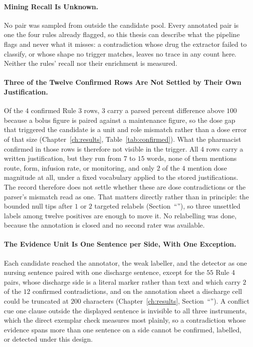 \paragraph{Mining Recall Is Unknown.} No pair was sampled from outside the candidate pool. Every
annotated pair is one the four rules already flagged, so this thesis can describe what the pipeline
flags and never what it misses: a contradiction whose drug the extractor failed to classify, or
whose shape no trigger matches, leaves no trace in any count here. Neither the rules' recall nor
their enrichment is measured.

\paragraph{Three of the Twelve Confirmed Rows Are Not Settled by Their Own Justification.}
Of the $4$ confirmed Rule 3 rows, $3$ carry a parsed percent difference above $100$ because a bolus
figure is paired against a maintenance figure, so the dose gap that triggered the candidate is a
unit and role mismatch rather than a dose error of that size (Chapter~\ref{ch:results},
Table~\ref{tab:confirmed}). What the pharmacist confirmed in those rows is therefore not visible in
the trigger. All $4$ rows carry a written justification, but they run from $7$ to $15$ words, none of
them mentions route, form, infusion rate, or monitoring, and only $2$ of the $4$ mention dose
magnitude at all, under a fixed vocabulary applied to the stored justifications. The record therefore
does not settle whether these are dose contradictions or the parser's mismatch read as one. That
matters directly rather than in principle: the bounded null tips after $1$ or $2$ targeted relabels
(Section~``''), so three unsettled labels among twelve positives are enough to
move it. No relabelling was done, because the annotation is closed and no second rater was available.

\paragraph{The Evidence Unit Is One Sentence per Side, With One Exception.} Each candidate reached the annotator, the
weak labeller, and the detector as one nursing sentence paired with one discharge sentence, except
for the $55$ Rule 4 pairs, whose discharge side is a literal marker rather than text and which
carry $2$ of the $12$ confirmed contradictions, and on
the annotation sheet a discharge cell could be truncated at $200$ characters
(Chapter~\ref{ch:results}, Section~``''). A conflict cue one clause outside
the displayed sentence is invisible to all three instruments, which the direct exemplar check
measures most plainly, so a contradiction whose evidence spans more than one sentence on a side
cannot be confirmed, labelled, or detected under this design.

